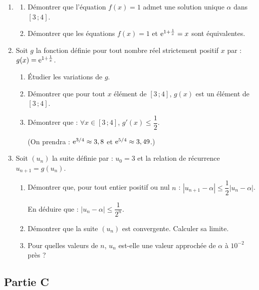 \begin{enumerate}
	\item
	\begin{enumerate}
		\item Démontrer que l'équation $f(x)=1$ admet une solution unique $\alpha$ dans $[3\,;4]$.
		\item Démontrer que les équations $f(x)=1$ et $\mathrm{e}^{1+\frac1x}=x$ sont équivalentes.
	\end{enumerate}
	\item Soit $g$ la fonction définie pour tout nombre réel strictement positif $x$ par : $g(x) = \mathrm{e}^{1+\frac1x}$.
	\begin{enumerate}
		\item Étudier les variations de $g$.
		\item Démontrer que pour tout $x$ élément de $[3\,;4]$, $g(x)$ est un élément de $[3\,;4]$.
		\item Démontrer que : $\forall x \in [3\,;4]$, $g'(x) \leqslant \dfrac12$.

		(On prendra : $\mathrm{e}^{3/4} \approx 3,8$ et $\mathrm{e}^{5/4} \approx 3,49$.)
	\end{enumerate}
	\item Soit $(u_n)$ la suite définie par : $u_0=3$ et la relation de récurrence $u_{n+1}=g(u_n)$.
	\begin{enumerate}
		\item Démontrer que, pour tout entier positif ou nul $n$ : $|u_{n+1}-\alpha| \leqslant \dfrac12|u_n-\alpha|$.

		En déduire que : $|u_n-\alpha| \leqslant \dfrac{1}{2^n}$.
		\item Démontrer que la suite $(u_n)$ est convergente. Calculer sa limite.
		\item Pour quelles valeurs de $n$, $u_n$ est-elle une valeur approchée de $\alpha$ à $10^{-2}$ près ?
	\end{enumerate}
\end{enumerate}

\subsection*{Partie C}

